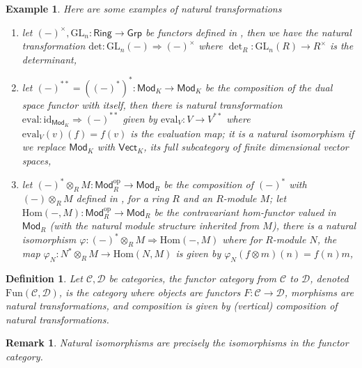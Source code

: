 \documentclass[10pt]{book}
\theoremstyle{bookplain}
\theoremstyle{bookdefinition}
\newtheorem{definition}[theorem]{Definition}
\newtheorem{example}[theorem]{Example}
\theoremstyle{bookremark}
\newtheorem{remark}[theorem]{Remark}
\begin{document}
\begin{example}Here are some examples of natural transformations
    \begin{enumerate}
        \item let $(-)^{\times},\mathrm{GL}_n:\mathsf{Ring}\rightarrow \mathsf{Grp}$ be functors defined in , then we have the natural transformation $\mathrm{det}:\mathrm{GL}_n(-)\Rightarrow (-)^\times$ where $\det_R:\mathrm{GL}_n(R)\rightarrow R^\times$ is the determinant,
        \item let $(-)^{**}=((-)^*)^*:\mathsf{Mod}_K\rightarrow \mathsf{Mod}_K$ be the composition of the dual space functor with itself, then there is natural transformation $\mathrm{eval}:\mathrm{id}_{\mathsf{Mod}_K}\Rightarrow (-)^{**}$ given by $\mathrm{eval}_V: V\rightarrow V^{**}$ where $\mathrm{eval}_V(v)(f)=f(v)$ is the evaluation map; it is a natural isomorphism if we replace $\mathsf{Mod}_K$ with $\mathsf{Vect}_K$, its full subcategory of finite dimensional vector spaces,
        \item let $(-)^*\otimes_R M:\mathsf{Mod}_R^{\mathrm{op}}\rightarrow \mathsf{Mod}_R$ be the composition of $(-)^*$ with $(-)\otimes_R M$ defined in , for a ring $R$ and an $R$-module $M$; let $\mathrm{Hom}(-,M):\mathsf{Mod}_R^{\mathrm{op}}\rightarrow \mathsf{Mod}_R$ be the contravariant hom-functor valued in $\mathsf{Mod}_R$ (with the natural module structure inherited from $M$), there is a natural isomorphism $\varphi:(-)^*\otimes_R M\Rightarrow \mathrm{Hom}(-,M)$ where for $R$-module $N$, the map $\varphi_N:N^*\otimes_RM\rightarrow \mathrm{Hom}(N,M)$ is given by $\varphi_N(f\otimes m)(n)=f(n)m$,
    \end{enumerate}
    
\end{example}

\begin{definition}Let $\mathscr{C},\mathscr{D}$ be categories, the \textit{functor category} from $\mathscr{C}$ to $\mathscr{D}$, denoted $\mathrm{Fun}(\mathscr{C},\mathscr{D})$, is the category where objects are functors $F:\mathscr{C}\rightarrow \mathscr{D}$, morphisms are natural transformations, and composition is given by (vertical) composition of natural transformations. 
\end{definition}

\begin{remark}
    \label{rmk:isom}
    Natural isomorphisms are precisely the isomorphisms in the functor category. 
\end{remark}
\end{document}
